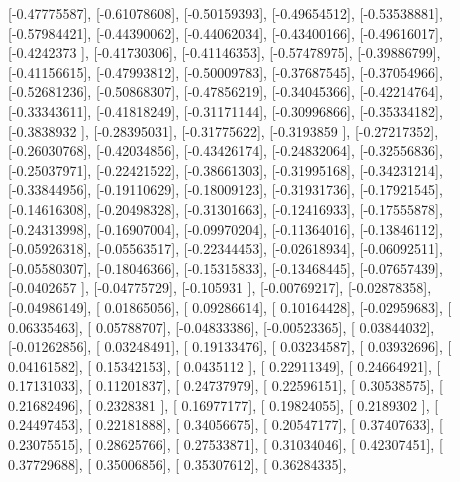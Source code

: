\documentclass{article}
\begin{document}
       [-0.47775587],
       [-0.61078608],
       [-0.50159393],
       [-0.49654512],
       [-0.53538881],
       [-0.57984421],
       [-0.44390062],
       [-0.44062034],
       [-0.43400166],
       [-0.49616017],
       [-0.4242373 ],
       [-0.41730306],
       [-0.41146353],
       [-0.57478975],
       [-0.39886799],
       [-0.41156615],
       [-0.47993812],
       [-0.50009783],
       [-0.37687545],
       [-0.37054966],
       [-0.52681236],
       [-0.50868307],
       [-0.47856219],
       [-0.34045366],
       [-0.42214764],
       [-0.33343611],
       [-0.41818249],
       [-0.31171144],
       [-0.30996866],
       [-0.35334182],
       [-0.3838932 ],
       [-0.28395031],
       [-0.31775622],
       [-0.3193859 ],
       [-0.27217352],
       [-0.26030768],
       [-0.42034856],
       [-0.43426174],
       [-0.24832064],
       [-0.32556836],
       [-0.25037971],
       [-0.22421522],
       [-0.38661303],
       [-0.31995168],
       [-0.34231214],
       [-0.33844956],
       [-0.19110629],
       [-0.18009123],
       [-0.31931736],
       [-0.17921545],
       [-0.14616308],
       [-0.20498328],
       [-0.31301663],
       [-0.12416933],
       [-0.17555878],
       [-0.24313998],
       [-0.16907004],
       [-0.09970204],
       [-0.11364016],
       [-0.13846112],
       [-0.05926318],
       [-0.05563517],
       [-0.22344453],
       [-0.02618934],
       [-0.06092511],
       [-0.05580307],
       [-0.18046366],
       [-0.15315833],
       [-0.13468445],
       [-0.07657439],
       [-0.0402657 ],
       [-0.04775729],
       [-0.105931  ],
       [-0.00769217],
       [-0.02878358],
       [-0.04986149],
       [ 0.01865056],
       [ 0.09286614],
       [ 0.10164428],
       [-0.02959683],
       [ 0.06335463],
       [ 0.05788707],
       [-0.04833386],
       [-0.00523365],
       [ 0.03844032],
       [-0.01262856],
       [ 0.03248491],
       [ 0.19133476],
       [ 0.03234587],
       [ 0.03932696],
       [ 0.04161582],
       [ 0.15342153],
       [ 0.0435112 ],
       [ 0.22911349],
       [ 0.24664921],
       [ 0.17131033],
       [ 0.11201837],
       [ 0.24737979],
       [ 0.22596151],
       [ 0.30538575],
       [ 0.21682496],
       [ 0.2328381 ],
       [ 0.16977177],
       [ 0.19824055],
       [ 0.2189302 ],
       [ 0.24497453],
       [ 0.22181888],
       [ 0.34056675],
       [ 0.20547177],
       [ 0.37407633],
       [ 0.23075515],
       [ 0.28625766],
       [ 0.27533871],
       [ 0.31034046],
       [ 0.42307451],
       [ 0.37729688],
       [ 0.35006856],
       [ 0.35307612],
       [ 0.36284335],
\end{document}
